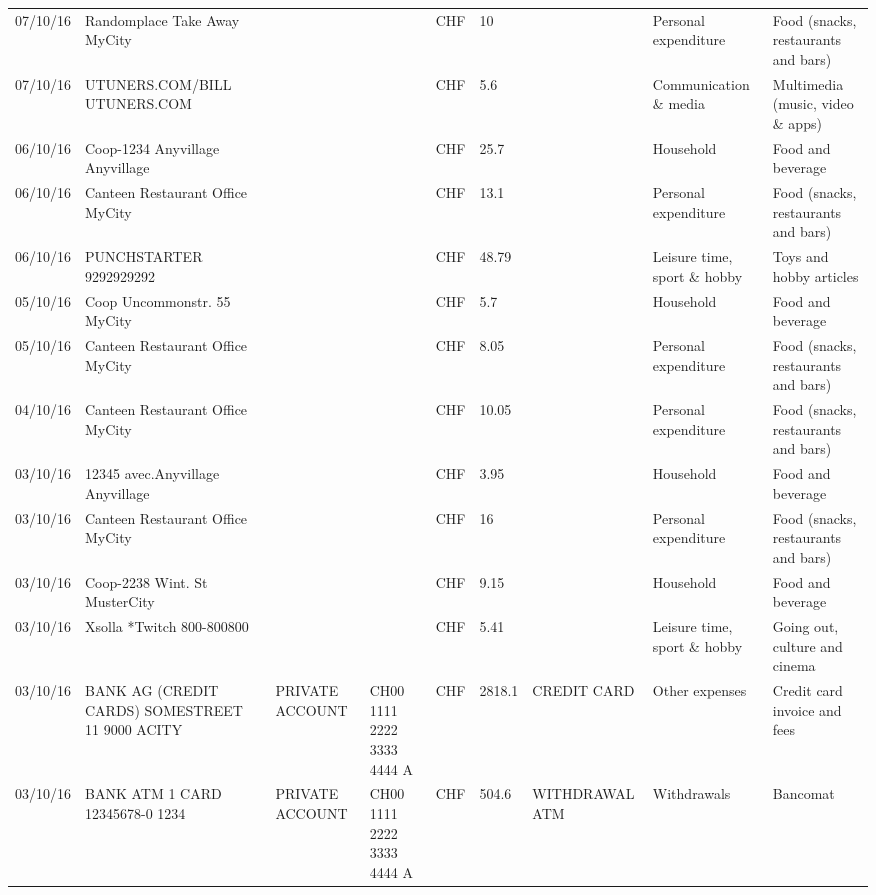 \begin{landscape}
\begin{adjustwidth}{-2cm}{-2cm}
\begin{tiny}
\begin{longtable}{lp{4cm}llllp{3cm}ll}
		07/10/16 & Randomplace Take Away     MyCity &       &       & CHF   & 10    &       & Personal expenditure & Food (snacks, restaurants and bars) \\
		07/10/16 & UTUNERS.COM/BILL          UTUNERS.COM &       &       & CHF   & 5.6   &       & Communication \& media & Multimedia (music, video \& apps) \\
		06/10/16 & Coop-1234 Anyvillage    Anyvillage &       &       & CHF   & 25.7  &       & Household & Food and beverage \\
		06/10/16 & Canteen Restaurant Office      MyCity &       &       & CHF   & 13.1  &       & Personal expenditure & Food (snacks, restaurants and bars) \\
		06/10/16 & PUNCHSTARTER     9292929292 &       &       & CHF   & 48.79 &       & Leisure time, sport \& hobby & Toys and hobby articles \\
		05/10/16 & Coop Uncommonstr. 55   MyCity &       &       & CHF   & 5.7   &       & Household & Food and beverage \\
		05/10/16 & Canteen Restaurant Office      MyCity &       &       & CHF   & 8.05  &       & Personal expenditure & Food (snacks, restaurants and bars) \\
		04/10/16 & Canteen Restaurant Office      MyCity &       &       & CHF   & 10.05 &       & Personal expenditure & Food (snacks, restaurants and bars) \\
		03/10/16 & 12345 avec.Anyvillage   Anyvillage &       &       & CHF   & 3.95  &       & Household & Food and beverage \\
		03/10/16 & Canteen Restaurant Office      MyCity &       &       & CHF   & 16    &       & Personal expenditure & Food (snacks, restaurants and bars) \\
		03/10/16 & Coop-2238 Wint. St       MusterCity &       &       & CHF   & 9.15  &       & Household & Food and beverage \\
		03/10/16 & Xsolla *Twitch           800-800800 &       &       & CHF   & 5.41  &       & Leisure time, sport \& hobby & Going out, culture and cinema \\
		03/10/16 & BANK AG (CREDIT CARDS) SOMESTREET 11 9000 ACITY & PRIVATE ACCOUNT & CH00 1111 2222 3333 4444 A & CHF   & 2818.1 & CREDIT CARD & Other expenses & Credit card invoice and fees \\
		03/10/16 & BANK ATM 1 CARD 12345678-0 1234 & PRIVATE ACCOUNT & CH00 1111 2222 3333 4444 A & CHF   & 504.6 & WITHDRAWAL ATM & Withdrawals & Bancomat \\

\end{longtable}
\end{tiny}
\end{adjustwidth}
\end{landscape}
